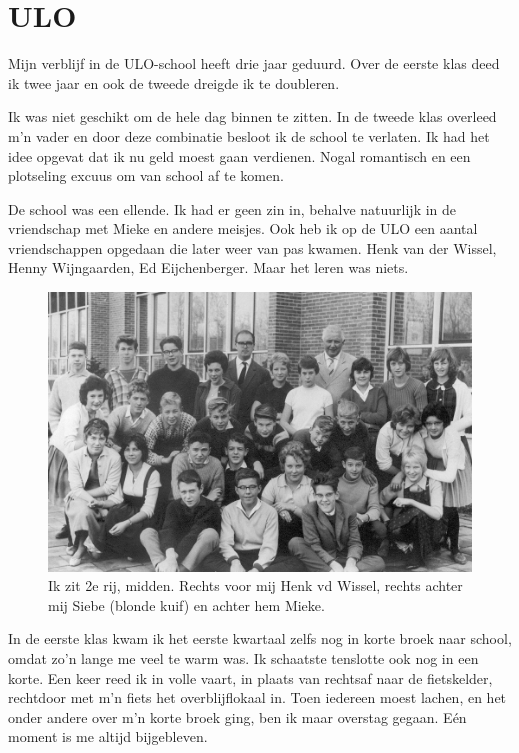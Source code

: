 \documentclass[10pt,twoside, openright]{memoir}
\begin{document}
\section{ULO} %
\label{cha:ulo}

Mijn verblijf in de ULO-school heeft drie jaar geduurd. Over de eerste klas deed ik twee jaar en ook de tweede dreigde ik te doubleren. 

Ik was niet geschikt om de hele dag binnen te zitten. In de tweede klas overleed m’n vader en door deze combinatie besloot ik de school te verlaten. Ik had het idee opgevat dat ik nu geld moest gaan verdienen. Nogal romantisch en een plotseling excuus om van school af te komen.  

De school was een ellende. Ik had er geen zin in, behalve natuurlijk in de vriendschap met Mieke en andere meisjes. Ook heb ik op de ULO een aantal vriendschappen opgedaan die later weer van pas kwamen. Henk van der Wissel, Henny Wijngaarden, Ed Eijchenberger. Maar het leren was niets. 

\begin{figure}
\includegraphics[width=\textwidth]{img/ch19/ULOSchool}
\caption*{\footnotesize Ik zit 2e rij, midden. Rechts voor mij Henk vd Wissel, rechts achter mij Siebe (blonde kuif) en achter hem Mieke. }
\end{figure}

In de eerste klas kwam ik het eerste kwartaal zelfs nog in korte broek naar school, omdat zo’n lange me veel te warm was. Ik schaatste tenslotte ook nog in een korte. Een keer reed ik in volle vaart, in plaats van rechtsaf naar de fietskelder, rechtdoor met m’n fiets het overblijflokaal in. Toen iedereen moest lachen, en het onder andere over m’n korte broek ging, ben ik maar overstag gegaan. Eén moment is me altijd bijgebleven. 
\end{document}
